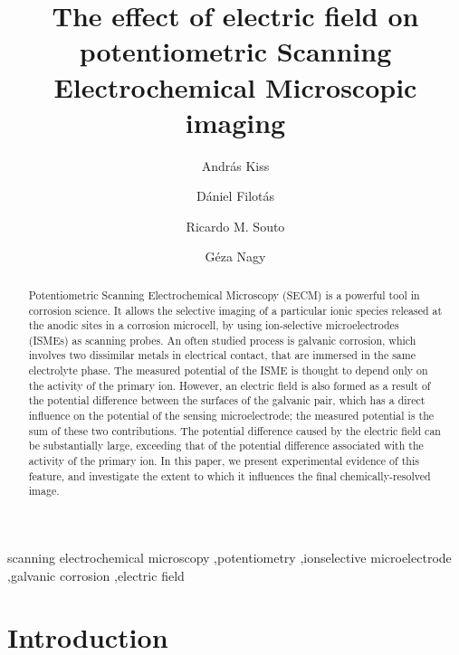 \documentclass[3p]{elsarticle}
\begin{document}
\begin{frontmatter}

\title{The effect of electric field on potentiometric Scanning Electrochemical Microscopic imaging}
\author[akiss]{András Kiss}
\address[akiss, gnagy]{Department of General and Physical Chemistry, Faculty of Sciences, University of Pécs, 7624 Pécs, Ifjúság útja 6, Hungary}
\address[rmsouto]{Department Chemistry, Universidad de La Laguna, P.O. Box 456, E-38200 La Laguna (Tenerife), Spain}
\author[dfilotas]{Dániel Filotás}
\author[rmsouto]{Ricardo M. Souto}
\author[gnagy]{Géza Nagy}


\begin{abstract}

Potentiometric Scanning Electrochemical Microscopy (SECM) is a powerful tool in corrosion science.
It allows the selective imaging of a particular ionic species released at the anodic sites in a corrosion microcell, by using ion-selective microelectrodes (ISMEs) as scanning probes.
An often studied process is galvanic corrosion, which involves two dissimilar metals in electrical contact, that are immersed in the same electrolyte phase.
The measured potential of the ISME is thought to depend only on the activity of the primary ion.
However, an electric field is also formed as a result of the potential difference between the surfaces of the galvanic pair, which has a direct influence on the potential of the sensing microelectrode; the measured potential is the sum of these two contributions.
The potential difference caused by the electric field can be substantially large, exceeding that of the potential difference associated with the activity of the primary ion.
In this paper, we present experimental evidence of this feature, and investigate the extent to which it influences the final chemically-resolved image. 
\end{abstract}
\begin{keyword}
	scanning electrochemical microscopy \sep potentiometry \sep ionselective microelectrode \sep galvanic corrosion \sep electric field
\end{keyword}
\end{frontmatter}

\section{Introduction}
\end{document}
